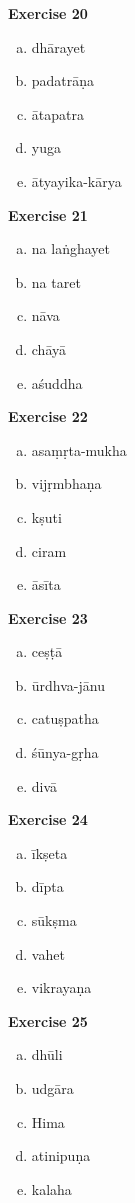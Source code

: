 \begin{multicols}{2}
\textbf{Exercise 20}
\vspace{-.3cm}
\begin{enumerate}[a.]
\item dhārayet 
\item padatrāṇa 
\item ātapatra 
\item yuga
\item ātyayika-kārya
\end{enumerate}

\textbf{Exercise 21}
\vspace{-.3cm}
\begin{enumerate}[a.]
\item na laṅghayet 
\item na taret
\item nāva 
\item chāyā 
\item aśuddha
\end{enumerate}

\textbf{Exercise 22}
\vspace{-.3cm}
\begin{enumerate}[a.]
\item asaṃṛta-mukha
\item vijṛmbhaṇa 	
\item kṣuti 
\item ciram
\item āsīta
\end{enumerate}

\textbf{Exercise 23}
\begin{enumerate}[a.]
\item ceṣṭā 
\item ūrdhva-jānu 
\item catuṣpatha 
\item śūnya-gṛha 
\item divā
\end{enumerate}

\textbf{Exercise 24}
\begin{enumerate}[a.]
\item īkṣeta 
\item dīpta 
\item sūkṣma
\item vahet
\item vikrayaṇa
\end{enumerate}

\textbf{Exercise 25}
\begin{enumerate}[a.]
\item dhūli 
\item udgāra
\item Hima
\item atinipuṇa
\item kalaha
\end{enumerate}


\end{multicols}
